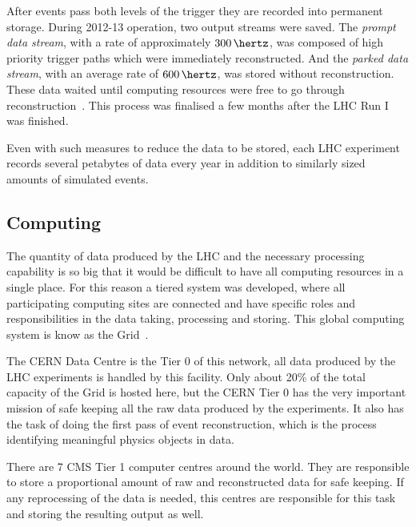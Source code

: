 After events pass both levels of the trigger they are recorded into permanent storage. During 2012-13 operation, two output streams were saved. The \textit{prompt data stream}, with a rate of approximately $300\,\hertz$, was composed of high priority trigger paths which were immediately reconstructed. And the \textit{parked data stream}, with an average rate of $600\,\hertz$, was stored without reconstruction. These data waited until computing resources were free to go through reconstruction~\cite{ARTICLE:CMSDataParking}. This process was finalised a few months after the \gls{LHC} Run I was finished.

Even with such measures to reduce the data to be stored, each \gls{LHC} experiment records several petabytes of data every year in addition to similarly sized amounts of simulated events.

\subsection{Computing}
\label{SUBSECTION:ExperimentalApparatus_CMS_Computing}


The quantity of data produced by the \gls{LHC} and the necessary processing capability is so big that it would be difficult to have all computing resources in a single place. For this reason a tiered system was developed, where all participating computing sites are connected and have specific roles and responsibilities in the data taking, processing and storing. This global computing system is know as the Grid~\cite{CMSTDR:CMSComputing}.

The \gls{CERN} Data Centre is the Tier 0 of this network, all data produced by the \gls{LHC} experiments is handled by this facility. Only about 20\% of the total capacity of the Grid is hosted here, but the \gls{CERN} Tier 0 has the very important mission of safe keeping all the raw data produced by the experiments. It also has the task of doing the first pass of event reconstruction, which is the process identifying meaningful physics objects in data.

There are 7 \gls{CMS} Tier 1 computer centres around the world. They are responsible to store a proportional amount of raw and reconstructed data for safe keeping. If any reprocessing of the data is needed, this centres are responsible for this task and storing the resulting output as well. 

